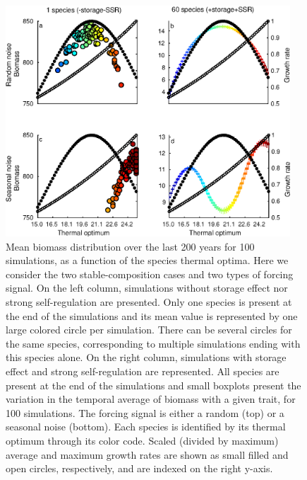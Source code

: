 \documentclass[smallcondensed,referee]{svjour3}       %
\begin{document}
\begin{figure}[!ht]
\begin{centering}
\includegraphics[bb=0bp 0bp 356bp 296bp,width=0.95\textwidth]{Fig3}
\par\end{centering}
\caption{Mean biomass distribution over the last 200 years for 100 simulations,
as a function of the species thermal optima. Here we consider the
two stable-composition cases and two types of forcing signal. On the
left column, simulations without storage effect nor strong self-regulation
are presented. Only one species is present at the end of the simulations
and its mean value is represented by one large colored circle per
simulation. There can be several circles for the same species, corresponding
to multiple simulations ending with this species alone. On the right
column, simulations with storage effect and strong self-regulation
are represented. All species are present at the end of the simulations
and small boxplots present the variation in the temporal average of
biomass with a given trait, for 100 simulations. The forcing signal
is either a random (top) or a seasonal noise (bottom). Each species
is identified by its thermal optimum through its color code. Scaled
(divided by maximum) average and maximum growth rates are shown as
small filled and open circles, respectively, and are indexed on the
right y-axis. \label{fig:Mean-biomass-in_stable_cases}}
\end{figure}
\end{document}

